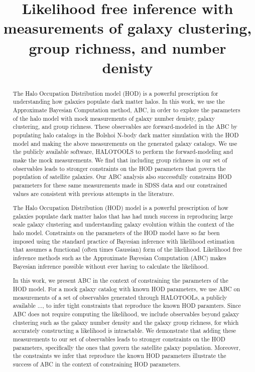 \documentclass[12pt, preprint]{aastex}
\begin{document}
\title{Likelihood free inference with measurements of galaxy clustering, group richness, and number denisty }

\begin{abstract}

The Halo Occupation Distribution model (HOD) is a powerful prescription for 
understanding how galaxies populate dark matter halos.
In this work, we use the Approximate Bayesian Computation method, 
ABC, in order to explore the parameters of the halo model with mock
measurements of galaxy number denisty, galaxy clustering, 
and group richness. These observables are forward-modeled in the ABC
by populating halo catalogs in the Bolshoi N-body dark matter simulation 
with the HOD model and making the above measurements on the generated
galaxy catalogs. We use the publicly available software, 
HALOTOOLS to perform the forward-modeling and make the mock measurements.
We find that including group richness in our set of observables leads to stronger
constraints on the HOD parameters that govern the population of satellite galaxies.
Our ABC analysis also successfully constrains HOD parameters for these same
measurements made in SDSS data and our constrained values are consistent with
previous attempts in the literature.

The Halo Occupation Distribution (HOD) model is a powerful prescription of how galaxies populate 
dark matter halos that has had much success in reproducing large scale galaxy clustering and understanding
galaxy evolution within the context of the halo model. Constraints on the parameters of the HOD model have 
so far been imposed using the standard practice of Bayesian inference with likelihood estimation that 
assumes a functional (often times Gaussian) form of the likelihood. Likelihood free inference methods such 
as the Approximate Bayesian Computation (ABC) makes Bayesian inference possible without ever having to calculate the likelihood. 

In this work, we present ABC in the context of constraining the parameters of the HOD model. For a mock 
galaxy catalog with known HOD parameters, we use ABC on measurements of a set of observables generated
through HALOTOOLs, a publicly available ..., to infer tight constraints that reproduce the known HOD paramters. 
Since ABC does not require computing the likelihood, we include observables beyond galaxy clustering such as 
the galaxy number density and the galaxy group richness, for which accurately constructing a likelihood is intractable. 
We demonstrate that adding these measurements to our set of observables leads to stronger constraints on the HOD parameters, 
specifically the ones that govern the satellite galaxy population. Moreover, the constraints we infer that 
reproduce the known HOD parameters illustrate the success of ABC in the context of constraining HOD parameters. 


\end{abstract}
\end{document}
